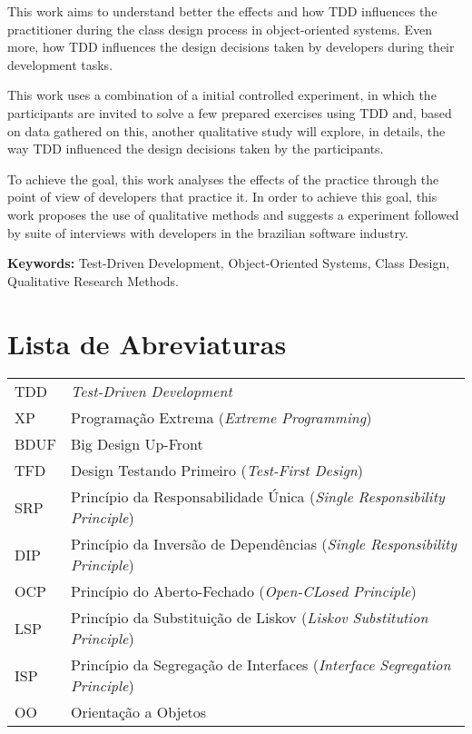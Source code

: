 \documentclass[11pt,openany,twoside,a4paper]{book}
\begin{document}
This work aims to understand better the effects and how TDD influences the
practitioner during the class design process in object-oriented systems. 
Even more, how TDD influences the design decisions taken by developers
during their development tasks.

This work uses a combination of a initial controlled experiment, in which the participants
are invited to solve a few prepared exercises using TDD and, based on data gathered on this,
another qualitative study will explore, in details, the way TDD influenced the design decisions
taken by the participants.

To achieve the goal, this work analyses the effects of the practice through the
point of view of developers that practice it. In order
to achieve this goal, this work proposes the use of qualitative methods and
suggests a experiment followed by suite of interviews  
with developers in the brazilian software industry.

\noindent \textbf{Keywords:} Test-Driven Development, Object-Oriented
Systems, Class Design, Qualitative Research Methods.

\tableofcontents    %

\chapter{Lista de Abreviaturas}
\begin{tabular}{ll}
         TDD         & \emph{Test-Driven Development}\\ 
         
         XP          & Programação Extrema (\emph{Extreme Programming})\\
		 
		 BDUF		 & Big Design Up-Front\\
		 
		 TFD         & Design Testando Primeiro (\emph{Test-First Design})\\
		 
		 SRP		 & Princípio da Responsabilidade Única (\emph{Single Responsibility
		 Principle})\\
		 
		 DIP		 & Princípio da Inversão de Dependências (\emph{Single Responsibility
		 Principle})\\ 
		 
		 OCP		 & Princípio do Aberto-Fechado (\emph{Open-CLosed Principle})\\
		 
		 LSP	 	 & Princípio da Substituição de Liskov (\emph{Liskov Substitution
		 Principle})\\
		 
		 ISP		 & Princípio da Segregação de Interfaces (\emph{Interface Segregation
		 Principle})\\
		 
		 OO		 	 & Orientação a Objetos
		 
\end{tabular}
\end{document}
